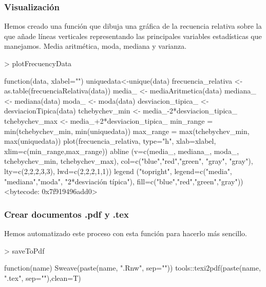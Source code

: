 \documentclass [a4paper] {article}
\begin{document}
\subsubsection{Visualización}
Hemos creado una función que dibuja una gráfica de la recuencia relativa sobre la que añade líneas verticales 
representando las principales variables estadísticas que manejamos.
Media aritmética, moda, mediana y varianza.
\begin{Schunk}
\begin{Sinput}
> plotFrecuencyData
\end{Sinput}
\begin{Soutput}
function(data, xlabel="") {
  uniquedata<-unique(data)
  frecuencia_relativa <- as.table(frecuenciaRelativa(data))
  media_ <- mediaAritmetica(data)
  mediana_ <- mediana(data)
  moda_ <- moda(data)
  desviacion_tipica_ <- desviacionTipica(data)
  tchebychev_min <- media_-2*desviacion_tipica_
  tchebychev_max <- media_+2*desviacion_tipica_
  min_range = min(tchebychev_min, min(uniquedata))
  max_range = max(tchebychev_min, max(uniquedata))
  plot(frecuencia_relativa, type="h", xlab=xlabel, xlim=c(min_range,max_range))
  abline (v=c(media_, mediana_, moda_, tchebychev_min, tchebychev_max), 
          col=c("blue","red","green", "gray", "gray"), lty=c(2,2,2,3,3),
          lwd=c(2,2,2,1,1))
  legend ("topright", legend=c("media", "mediana","moda", "2*desviación típica"),
          fill=c("blue","red","green","gray"))
}
<bytecode: 0x7f919496add0>
\end{Soutput}
\end{Schunk}
\subsubsection{Crear documentos .pdf y .tex}
Hemos automatizado este proceso con esta función para hacerlo más sencillo.
\begin{Schunk}
\begin{Sinput}
> saveToPdf
\end{Sinput}
\begin{Soutput}
function(name){
  Sweave(paste(name, ".Rnw", sep=""))
  tools::texi2pdf(paste(name, ".tex", sep=""),clean=T)
}
\end{Soutput}
\end{Schunk}
\end{document}

